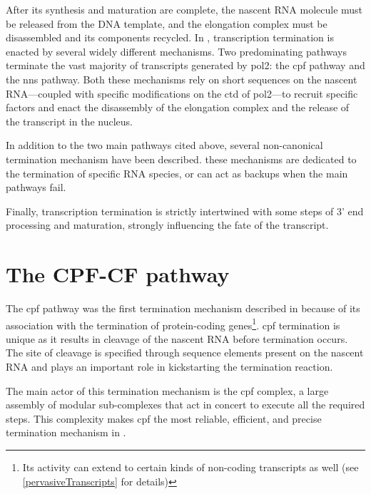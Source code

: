 After its synthesis and maturation are complete, the nascent RNA molecule must be released from the DNA template, and the elongation complex must be disassembled and its components recycled.
In \cer{}, transcription termination is enacted by several widely different mechanisms.
Two predominating pathways terminate the vast majority of transcripts generated by \acrlong{pol2}: the \gls{cpf} pathway and the \gls{nns}  pathway. 
Both these mechanisms rely on short sequences on the nascent RNA---coupled with specific modifications on the \gls{ctd} of \gls{pol2}---to recruit specific factors and enact the disassembly of the elongation complex and the release of the transcript in the nucleus.

In addition to the two main pathways cited above, several non-canonical termination mechanism have been described.
these mechanisms are dedicated to the termination of specific RNA species, or can act as backups when the main pathways fail.


Finally, transcription termination is strictly intertwined with some steps of 3' end processing and maturation, strongly influencing the fate of the transcript. 



\section{The CPF-CF pathway}
The \gls{cpf} pathway was the first termination mechanism described in \cer{} because of its association with the termination of protein-coding genes\footnote{Its activity can extend to certain kinds of non-coding transcripts as well (see \ref{pervasiveTranscripts} for details)}. 
\gls{cpf} termination is unique as it results in cleavage of the nascent RNA before termination occurs.
The site of cleavage is specified through sequence elements present on the nascent RNA and plays an important role in kickstarting the termination reaction.

The main actor of this termination mechanism is the \gls{cpf} complex, a large assembly of modular sub-complexes that act in concert to execute all the required steps. 
This complexity makes \gls{cpf} the most reliable, efficient, and precise termination mechanism in \cer{}.

